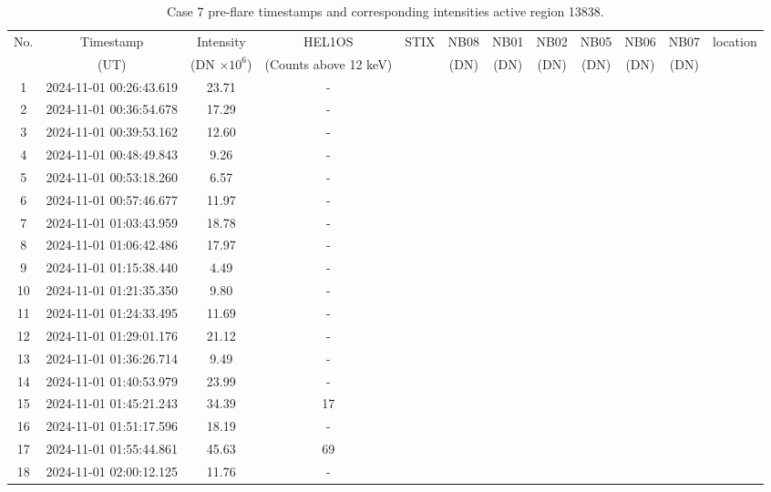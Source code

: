 \documentclass[fleqn,usenatbib]{mnras}
\begin{document}
\begin{table}
    \centering
    \caption{Case 7 pre-flare timestamps and corresponding intensities active region 13838.}
   \begin{tabular}{cccccccccccc}
        \hline
        No. & Timestamp & Intensity & HEL1OS & STIX & NB08 &NB01 & NB02 & NB05 & NB06 & NB07 & location\\
        &(UT) & (DN $\times 10^6$) & (Counts above 12 keV) & & (DN)& (DN)& (DN)& (DN)& (DN) & (DN)\\
        \hline
        1 & 2024-11-01 00:26:43.619 & 23.71 & -\\
		2 & 2024-11-01 00:36:54.678 & 17.29 & -\\
		3 & 2024-11-01 00:39:53.162 & 12.60 & -\\
		4 & 2024-11-01 00:48:49.843 & 9.26 & -\\
		5 & 2024-11-01 00:53:18.260 & 6.57 & -\\
		6 & 2024-11-01 00:57:46.677 & 11.97 & -\\
		7 & 2024-11-01 01:03:43.959 & 18.78 & -\\
		8 & 2024-11-01 01:06:42.486 & 17.97 & -\\
		9 & 2024-11-01 01:15:38.440 & 4.49 & -\\
		10 & 2024-11-01 01:21:35.350 & 9.80 & -\\
		11 & 2024-11-01 01:24:33.495 & 11.69 & -\\
		12 & 2024-11-01 01:29:01.176 & 21.12 & -\\
		13 & 2024-11-01 01:36:26.714 & 9.49 & -\\
		14 & 2024-11-01 01:40:53.979 & 23.99 & -\\
		15 & 2024-11-01 01:45:21.243 & 34.39 & 17\\
		16 & 2024-11-01 01:51:17.596 & 18.19 & -\\
		17 & 2024-11-01 01:55:44.861 & 45.63 & 69\\
		18 & 2024-11-01 02:00:12.125 & 11.76 & -\\

        \hline
    \end{tabular}
\end{table}
\end{document}
